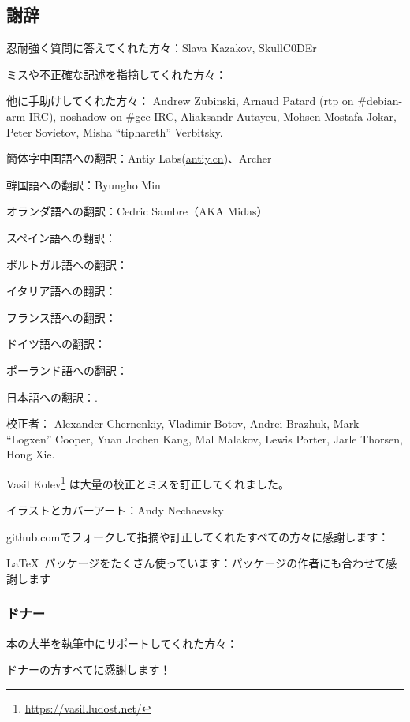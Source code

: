 \subsection*{謝辞}

忍耐強く質問に答えてくれた方々：Slava  Kazakov, SkullC0DEr

ミスや不正確な記述を指摘してくれた方々：\PeopleMistakesInaccuracies{}

他に手助けしてくれた方々：
Andrew Zubinski,
Arnaud Patard (rtp on \#debian-arm IRC),
noshadow on \#gcc IRC,
Aliaksandr Autayeu,
Mohsen Mostafa Jokar,
Peter Sovietov,
Misha ``tiphareth'' Verbitsky.

簡体字中国語への翻訳：Antiy Labs(\href{http://antiy.cn}{antiy.cn})、Archer

韓国語への翻訳：Byungho Min

オランダ語への翻訳：Cedric Sambre（AKA Midas）

スペイン語への翻訳： \PeopleSpanishTranslators{}

ポルトガル語への翻訳：\PeoplePTBRTranslators{}

イタリア語への翻訳：\PeopleItalianTranslators{}

フランス語への翻訳：\PeopleFrenchTranslators{}

ドイツ語への翻訳：\PeopleGermanTranslators{}

ポーランド語への翻訳：\PeoplePolishTranslators{}

日本語への翻訳：\PeopleJapaneseTranslators{}.

校正者：
Alexander  Chernenkiy,
Vladimir Botov,
Andrei Brazhuk,
Mark ``Logxen'' Cooper, Yuan Jochen Kang, Mal Malakov, Lewis Porter, Jarle Thorsen, Hong Xie.

Vasil Kolev\footnote{\url{https://vasil.ludost.net/}} は大量の校正とミスを訂正してくれました。

イラストとカバーアート：Andy Nechaevsky

github.comでフォークして指摘や訂正してくれたすべての方々に感謝します：\FNGithubContributors{}

\LaTeX\ パッケージをたくさん使っています：パッケージの作者にも合わせて感謝します

\subsubsection*{ドナー}

本の大半を執筆中にサポートしてくれた方々：



ドナーの方すべてに感謝します！
